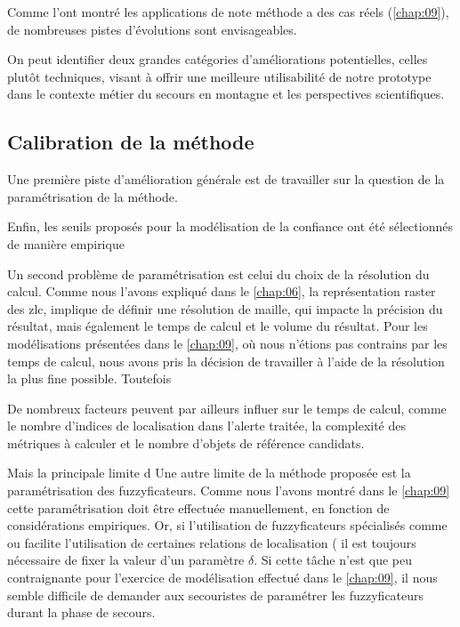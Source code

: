 
Comme l'ont montré les applications de note méthode a des cas réels
(\autoref{chap:09}), de nombreuses pistes d'évolutions sont
envisageables.

On peut identifier deux grandes catégories d'améliorations
potentielles, celles plutôt techniques, visant à offrir une meilleure
utilisabilité de notre prototype dans le contexte métier du secours en
montagne et les perspectives scientifiques.




\subsection*{Calibration de la méthode}

Une première piste d'amélioration générale est de travailler sur la
question de la paramétrisation de la méthode. 



Enfin, les seuils proposés pour la modélisation de la confiance ont
été sélectionnés de manière empirique


Un second problème de paramétrisation est celui du choix de la
résolution du calcul. Comme nous l'avons expliqué dans le
\autoref{chap:06}, la représentation raster des \ac{zlc}, implique de
définir une résolution de maille, qui impacte la précision du
résultat, mais également le temps de calcul et le volume du
résultat. Pour les modélisations présentées dans le \autoref{chap:09},
où nous n'étions pas contrains par les temps de calcul, nous avons
pris la décision de travailler à l'aide de la résolution la plus fine
possible. Toutefois


De nombreux facteurs peuvent par ailleurs influer sur le temps de
calcul, comme le nombre d'indices de localisation dans l'alerte
traitée, la complexité des métriques à calculer et le nombre d'objets
de référence candidats.


Mais la principale limite d
%
Une autre limite de la méthode proposée est la paramétrisation des
fuzzyficateurs. Comme nous l'avons montré dans le \autoref{chap:09}
cette paramétrisation doit être effectuée manuellement, en fonction de
considérations empiriques. Or, si l'utilisation de fuzzyficateurs
spécialisés comme  ou 
facilite l'utilisation de certaines relations de localisation (\eg
{} il est toujours nécessaire de fixer la valeur
d'un paramètre \(\delta\). Si cette tâche n'est que peu contraignante
pour l'exercice de modélisation effectué dans le \autoref{chap:09}, il
nous semble difficile de demander aux secouristes de paramétrer les
fuzzyficateurs durant la phase de secours.

